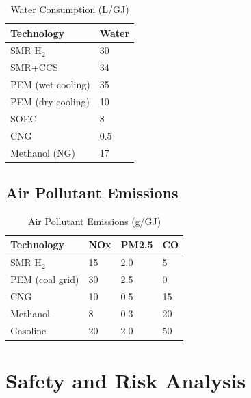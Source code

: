 \documentclass[12pt,twoside,openany]{book}
\begin{document}
\begin{table}[htbp]
    \centering
    \caption{Water Consumption (L/GJ)}
    \label{tab:water}
    \begin{tabular}{L{5cm} C{3cm}}
    \hline
    \textbf{Technology} & \textbf{Water} \\
    \hline
    SMR H$_2$         & 30   \\
    SMR+CCS           & 34   \\
    PEM (wet cooling) & 35   \\
    PEM (dry cooling) & 10   \\
    SOEC              & 8    \\
    CNG               & 0.5  \\
    Methanol (NG)     & 17   \\
    \hline
    \end{tabular}
\end{table}

\section{Air Pollutant Emissions}

\begin{table}[htbp]
    \centering
    \caption{Air Pollutant Emissions (g/GJ)}
    \label{tab:air}
    \begin{tabular}{L{4cm} C{1.5cm} C{1.5cm} C{1.5cm}}
    \hline
    \textbf{Technology} & \textbf{NOx} & \textbf{PM2.5} & \textbf{CO} \\
    \hline
    SMR H$_2$      & 15 & 2.0 & 5  \\
    PEM (coal grid)& 30 & 2.5 & 0  \\
    CNG            & 10 & 0.5 & 15 \\
    Methanol       & 8  & 0.3 & 20 \\
    Gasoline       & 20 & 2.0 & 50 \\
    \hline
    \end{tabular}
\end{table}


\chapter{Safety and Risk Analysis}
\end{document}
